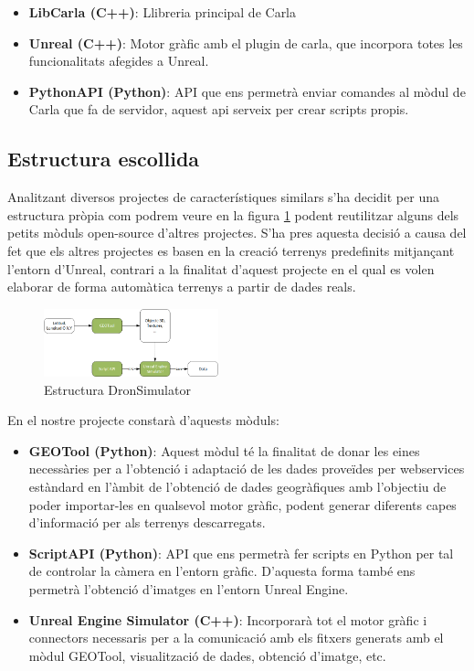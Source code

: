 \documentclass[10pt,a4paper,twocolumn,twoside]{article}
\begin{document}
\begin{itemize}
 \item \textbf{LibCarla (C++)}: Llibreria principal de Carla
 \item \textbf{Unreal (C++)}: Motor gràfic amb el plugin de carla, que incorpora totes les funcionalitats afegides a Unreal.
 \item \textbf{PythonAPI (Python)}: API que ens permetrà enviar comandes al mòdul de Carla que fa de servidor, aquest api serveix per crear scripts propis.
\end{itemize}


\subsection{Estructura escollida}

Analitzant diversos projectes de característiques similars s'ha decidit per una estructura pròpia com podrem veure en la figura \ref{fig-dronsimulatormodules} podent reutilitzar alguns dels petits mòduls open-source d'altres projectes. S'ha pres aquesta decisió a causa del fet que els altres projectes es basen en la creació terrenys predefinits mitjançant l'entorn d'Unreal, contrari a la finalitat d'aquest projecte en el qual es volen elaborar de forma automàtica terrenys a partir de dades reals.

\begin{figure}[!h]
\centering
  	\includegraphics[width=0.45\textwidth]{structuretfg}
	\caption{Estructura DronSimulator}
	\label{fig-dronsimulatormodules}
\end{figure}

En el nostre projecte constarà d'aquests mòduls:

\begin{itemize}
  \item \textbf{GEOTool (Python)}: Aquest mòdul té la finalitat de donar les eines necessàries per a l'obtenció i adaptació de les dades proveïdes per webservices estàndard en l'àmbit de l'obtenció de dades geogràfiques amb l'objectiu de poder importar-les en qualsevol motor gràfic, podent generar diferents capes d'informació per als terrenys descarregats.
  \item \textbf{ScriptAPI (Python)}: API que ens permetrà fer scripts en Python per tal de controlar la càmera en l'entorn gràfic. D'aquesta forma també ens permetrà l'obtenció d'imatges en l'entorn Unreal Engine.
  \item \textbf{Unreal Engine Simulator (C++)}: Incorporarà tot el motor gràfic i connectors necessaris per a la comunicació amb els fitxers generats amb el mòdul GEOTool, visualització de dades, obtenció d'imatge, etc.
\end{itemize}
\end{document}
